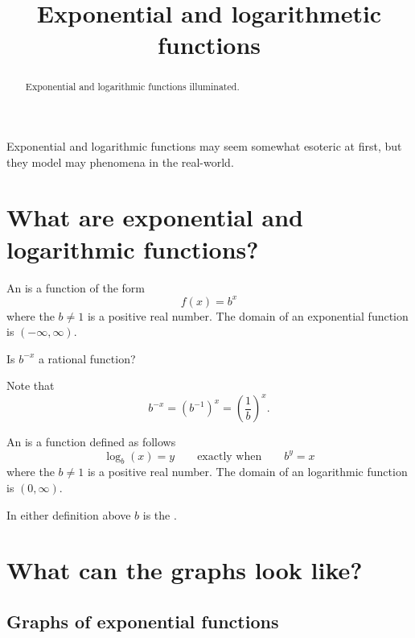 \documentclass{ximera}
\title[Dig-In:]{Exponential and logarithmetic functions}
\begin{document}
\begin{abstract}
  Exponential and logarithmic functions illuminated.
\end{abstract}
\maketitle

Exponential and logarithmic functions may seem somewhat esoteric at
first, but they model may phenomena in the real-world.




\section{What are exponential and logarithmic functions?}


\begin{definition}
  An  is a function of the form
  \[
  f(x) = b^x
  \]
  where the $b\ne 1$ is a positive real number. The domain of an
  exponential function is $(-\infty,\infty)$.
\end{definition}

\begin{question}
  Is $b^{-x}$ a rational function?
  \begin{multipleChoice}
  \end{multipleChoice}
  \begin{feedback}
    Note that
    \[
    b^{-x} = \left(b^{-1}\right)^x = \left(\frac{1}{b}\right)^x.
    \]
  \end{feedback}
\end{question}



\begin{definition}
  An  is a function defined as follows
  \[
  \log_b(x) = y \qquad\text{exactly when}\qquad b^y = x
  \]
  where the $b\ne 1$ is a positive real number. The domain of an
  logarithmic function is $(0,\infty)$.
\end{definition}

In either definition above $b$ is the .




\section{What can the graphs look like?}

\subsection{Graphs of exponential functions}
\end{document}
